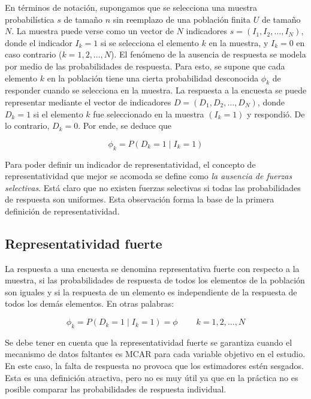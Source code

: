 \documentclass[
  12pt,
  spanish,
]{book}
\begin{document}
En términos de notación, supongamos que se selecciona una muestra probabilística \(s\) de tamaño \(n\) sin reemplazo de una población finita \(U\) de tamaño \(N\). La muestra puede verse como un vector de \(N\) indicadores \(s=(I_{1},I_{2},\ldots,I_{N})\), donde el indicador \(I_{k}=1\) si se selecciona el elemento \(k\) en la muestra, y \(I_{k}=0\) en caso contrario (\(k=1,2,\ldots,N\)). El fenómeno de la ausencia de respuesta se modela por medio de las probabilidades de respuesta. Para esto, se supone que cada elemento \(k\) en la población tiene una cierta probabilidad desconocida \(\phi_{k}\) de responder cuando se selecciona en la muestra. La respuesta a la encuesta se puede representar mediante el vector de indicadores \(D=(D_{1},D_{2},\ldots,D_{N})\), donde \(D_{k}=1\) si el elemento \(k\) fue seleccionado en la muestra \((I_{k}=1)\) y respondió. De lo contrario, \(D_{k}=0\). Por ende, se deduce que

\[
\phi_{k}=P\left(D_{k}=1\mid I_{k}=1\right)
\]

Para poder definir un indicador de representatividad, el concepto
de representatividad que mejor se acomoda se define como \emph{la ausencia de fuerzas selectivas}. Está claro que no existen fuerzas selectivas si todas las probabilidades de respuesta son uniformes. Esta observación forma la base de la primera definición de representatividad.

\hypertarget{representatividad-fuerte}{%
\subsection{Representatividad fuerte}\label{representatividad-fuerte}}

La respuesta a una encuesta se denomina representativa fuerte con
respecto a la muestra, si las probabilidades de respuesta de todos
los elementos de la población son iguales y si la respuesta de un
elemento es independiente de la respuesta de todos los demás elementos.
En otras palabras:

\[
\phi_{k} = P\left(D_{k}=1\mid I_{k}=1\right) =  \phi  \ \ \ \ \ \ \ \ \ \ k=1,2,\ldots,N
\]

Se debe tener en cuenta que la representatividad fuerte se garantiza cuando el mecanismo de datos faltantes es MCAR para cada variable objetivo en el estudio. En este caso, la falta de respuesta no provoca que los estimadores estén sesgados. Esta es una definición atractiva, pero no es muy útil ya que en la práctica no es posible comparar las probabilidades de respuesta individual.
\end{document}
